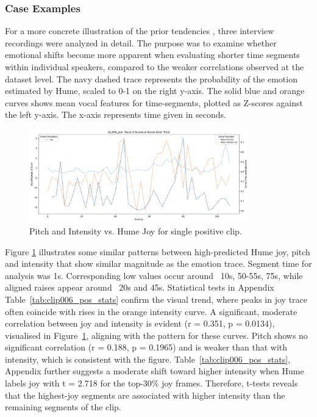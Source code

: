   


\subsubsection{Case Examples}
\label{sec:res_rq1_case}
For a more concrete illustration of the prior tendencies , three interview recordings were analyzed in detail. The purpose was to examine whether emotional shifts become more apparent when evaluating shorter time segments within individual speakers, compared to the weaker correlations observed at the dataset level.
The navy dashed trace represents the probability of the emotion estimated by Hume, scaled to 0-1 on the right y-axis. 
The solid blue and orange curves shows mean vocal features for time-segments, plotted as Z-scores against the left y-axis. The x-axis represents time given in seconds.


\medskip


\begin{figure}[H]
    \centering
    
    \includegraphics[width=0.85\textwidth]{png/results/rq3_2/combined_zscore_hume_id_006_pos_4.pdf}
    \caption{Pitch and Intensity vs. Hume Joy for single positive clip.}
    \label{fig:006_pos-joy}
\end{figure}


  Figure \ref{fig:006_pos-joy} illustrates some similar patterns between high-predicted Hume joy, pitch and intensity that show similar magnitude as the emotion trace. Segment time for analysis was 1s.
  Corresponding low values occur around ~10s, 50-55s, 75s, while aligned raises appear around ~20s and 45s. Statistical tests in Appendix Table~\ref{tab:clip006_pos_stats} confirm the visual trend, where peaks in joy trace often coincide with rises in the orange intensity curve. 
  A significant, moderate correlation between joy and intensity is evident (r = 0.351, p = 0.0134), visualised in Figure~\ref{fig:006_pos-joy}, aligning with the pattern for these curves. 
  Pitch shows no significant correlation (r = 0.188, p = 0.1965) and is weaker than that with intensity, which is consistent with the figure.
  Table~\ref{tab:clip006_pos_stats}, Appendix further suggests a moderate shift toward higher intensity when Hume labels joy with t = 2.718 for the top-30\% joy frames. Therefore, t-tests reveals that the highest-joy segments are associated with higher intensity than the remaining segments of the clip.

